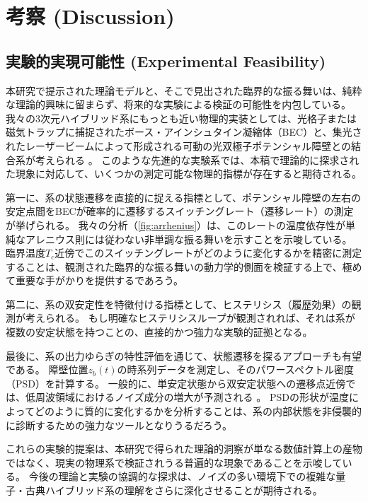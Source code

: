 \documentclass[a4paper,11pt,ja=standard,lualatex]{bxjsarticle}
\newcommand{\figref}[1]{\cref{#1}}
\begin{document}
\FloatBarrier

\section{考察 (Discussion)}
\label{sec:discussion}

\subsection{実験的実現可能性 (Experimental Feasibility)}
\label{subsec:feasibility}
本研究で提示された理論モデルと、そこで見出された臨界的な振る舞いは、純粋な理論的興味に留まらず、将来的な実験による検証の可能性を内包している。
我々の3次元ハイブリッド系にもっとも近い物理的実装としては、光格子または磁気トラップに捕捉されたボース・アインシュタイン凝縮体（BEC）と、集光されたレーザービームによって形成される可動の光双極子ポテンシャル障壁との結合系が考えられる \cite{Grimm2000}。
このような先進的な実験系では、本稿で理論的に探求された現象に対応して、いくつかの測定可能な物理的指標が存在すると期待される。

第一に、系の状態遷移を直接的に捉える指標として、ポテンシャル障壁の左右の安定点間をBECが確率的に遷移するスイッチングレート（遷移レート）の測定が挙げられる。
我々の分析（\figref{fig:arrhenius}）は、このレートの温度依存性が単純なアレニウス則には従わない非単調な振る舞いを示すことを示唆している。
臨界温度$T_c$近傍でこのスイッチングレートがどのように変化するかを精密に測定することは、観測された臨界的な振る舞いの動力学的側面を検証する上で、極めて重要な手がかりを提供するであろう。

第二に、系の双安定性を特徴付ける指標として、ヒステリシス（履歴効果）の観測が考えられる。
もし明確なヒステリシスループが観測されれば、それは系が複数の安定状態を持つことの、直接的かつ強力な実験的証拠となる。

最後に、系の出力ゆらぎの特性評価を通じて、状態遷移を探るアプローチも有望である。
障壁位置$z_b(t)$の時系列データを測定し、そのパワースペクトル密度（PSD）を計算する。
一般的に、単安定状態から双安定状態への遷移点近傍では、低周波領域におけるノイズ成分の増大が予測される \cite{Weissman1988}。
PSDの形状が温度によってどのように質的に変化するかを分析することは、系の内部状態を非侵襲的に診断するための強力なツールとなりうるだろう。

これらの実験的提案は、本研究で得られた理論的洞察が単なる数値計算上の産物ではなく、現実の物理系で検証されうる普遍的な現象であることを示唆している。
今後の理論と実験の協調的な探求は、ノイズの多い環境下での複雑な量子・古典ハイブリッド系の理解をさらに深化させることが期待される。
\end{document}
